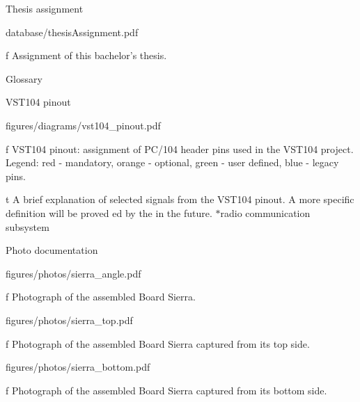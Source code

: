 

\app Thesis assignment

\midinsert
    \hsize \cinspic database/thesisAssignment.pdf
    \caption/f Assignment of this bachelor's thesis.
\endinsert




\app Glossary




\app VST104 pinout

\midinsert
    \hsize \cinspic figures/diagrams/vst104_pinout.pdf
    \caption/f VST104 pinout: assignment of PC/104 header pins used in the VST104 project. Legend: red - mandatory, orange - optional, green - user defined, blue - legacy pins.
\endinsert

\midinsert {}
    \caption/t A brief explanation of selected signals from the VST104 pinout. A more specific definition will be proved ed by the  in the future. $*$radio communication subsystem
\endinsert




\app Photo documentation

\midinsert
    \hsize \cinspic figures/photos/sierra_angle.pdf
    \caption/f Photograph of the assembled Board Sierra.
\endinsert

\midinsert
    \hsize \cinspic figures/photos/sierra_top.pdf
    \caption/f Photograph of the assembled Board Sierra captured from its top side.
\endinsert

\midinsert
    \hsize \cinspic figures/photos/sierra_bottom.pdf
    \caption/f Photograph of the assembled Board Sierra captured from its bottom side.
\endinsert

